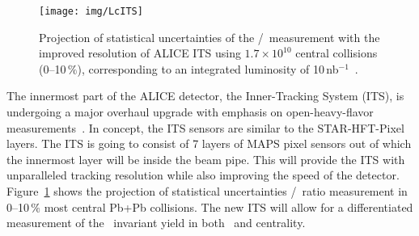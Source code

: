 \begin{figure}[!htb]
\centering
\texttt{[image: img/LcITS]}
\caption{Projection of statistical uncertainties of the \Lambdac/\dzero\ measurement with the improved resolution of ALICE ITS using $1.7\times 10^{10}$ central collisions (0--10$\,\%$), corresponding to an integrated luminosity of 10$\,$nb$^{-1}$~\cite{ITS_CDR}.}
\label{ITS_Lc}
\end{figure}

The innermost part of the ALICE detector, the Inner-Tracking System (ITS),  is undergoing a major overhaul upgrade with emphasis on open-heavy-flavor measurements~\cite{ITS_CDR}\@. In concept, the ITS sensors are similar to the STAR-HFT-Pixel~\cite{HftFinal} layers. The ITS is going to consist of 7 layers of MAPS pixel sensors out of which the innermost layer will be inside the beam pipe. This will provide the ITS with unparalleled tracking resolution while also improving the speed of the detector. Figure~\ref{ITS_Lc} shows the projection of statistical uncertainties \Lambdac/\dzero\ ratio measurement in 0--10$\,\%$ most central Pb+Pb collisions. The new ITS will allow for a differentiated measurement of the \Lambdac\ invariant yield in both \pt\ and centrality. 

